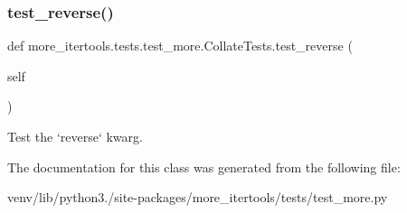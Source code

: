 \subsubsection{\texorpdfstring{test\+\_\+reverse()}{test\_reverse()}}
{\footnotesize\ttfamily def more\+\_\+itertools.\+tests.\+test\+\_\+more.\+Collate\+Tests.\+test\+\_\+reverse (\begin{DoxyParamCaption}\item[{}]{self }\end{DoxyParamCaption})}

\begin{DoxyVerb}Test the `reverse` kwarg.\end{DoxyVerb}
 

The documentation for this class was generated from the following file\+:\begin{DoxyCompactItemize}
\item 
venv/lib/python3./site-\/packages/more\+\_\+itertools/tests/test\+\_\+more.\+py\end{DoxyCompactItemize}
